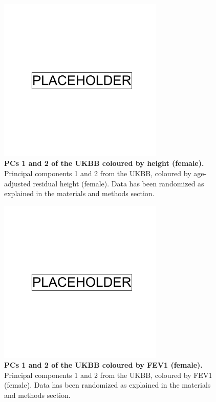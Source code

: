 \newpage

\begin{figure}
    \centering
    \includegraphics[width=0.7\textwidth]{placeholder.png}
    \caption[PCs 1 and 2 of the UKBB coloured by height (female)]{\textbf{PCs 1 and 2 of the UKBB coloured by height (female).} Principal components 1 and 2 from the UKBB, coloured by age-adjusted residual height (female). Data has been randomized as explained in the materials and methods section.}
    \label{fig:supp_ukbb_pca_height_res_f}
\end{figure}

\newpage

\begin{figure}
    \centering
    \includegraphics[width=0.7\textwidth]{placeholder.png}
    \caption[PCs 1 and 2 of the UKBB coloured by FEV1 (female)]{\textbf{PCs 1 and 2 of the UKBB coloured by FEV1 (female).} Principal components 1 and 2 from the UKBB, coloured by FEV1 (female). Data has been randomized as explained in the materials and methods section.}
    \label{fig:supp_ukbb_pca_fev_f}
\end{figure}

